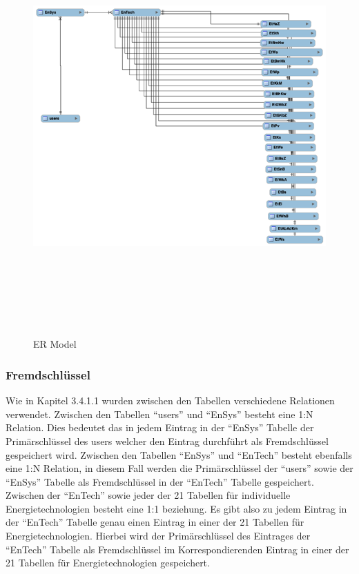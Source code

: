 \begin{figure}[h]
	\centering
	\includegraphics[height=16cm,width=18cm]{images/ERModel}
	\caption{ER Model}
	\label{fig:ERModel}
\end{figure}
\newpage
\subsubsection{Fremdschlüssel}
Wie in Kapitel 3.4.1.1 wurden zwischen den Tabellen verschiedene Relationen verwendet. Zwischen den Tabellen “users” und “EnSys” besteht eine 1:N Relation. Dies bedeutet das in jedem Eintrag in der “EnSys” Tabelle der Primärschlüssel des users welcher den Eintrag durchführt als Fremdschlüssel gespeichert wird. Zwischen den Tabellen “EnSys” und “EnTech” besteht ebenfalls eine 1:N Relation, in diesem Fall werden die Primärschlüssel der “users” sowie der “EnSys” Tabelle als Fremdschlüssel in der “EnTech” Tabelle gespeichert. Zwischen der “EnTech” sowie jeder der 21 Tabellen für individuelle Energietechnologien besteht eine 1:1 beziehung. Es gibt also zu jedem Eintrag in der “EnTech” Tabelle genau einen Eintrag in einer der 21 Tabellen für Energietechnologien. Hierbei wird der Primärschlüssel des Eintrages der “EnTech” Tabelle als Fremdschlüssel im Korrespondierenden Eintrag in einer der 21 Tabellen für Energietechnologien gespeichert.




